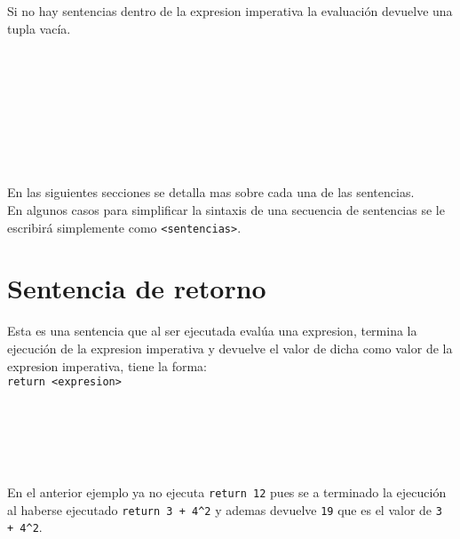       Si no hay sentencias dentro de la expresion imperativa la evaluación devuelve una tupla vacía.
      
      \begin{fxcode}
         \\
         \outcode{()}\\
         \\
         \\
         \outcode{()}\\
         \\
         \\
         \outcode{()}
      \end{fxcode}
      
      En las siguientes secciones se detalla mas sobre cada una de las sentencias.
      \\
      
      En algunos casos para simplificar la sintaxis de una secuencia de sentencias se le escribirá simplemente como \texttt{<sentencias>}.
      
   \section{Sentencia de retorno}
      Esta es una sentencia que al ser ejecutada evalúa una expresion, termina la ejecución de la expresion imperativa y devuelve el valor de dicha como valor de la expresion imperativa, tiene la forma:
      \\
      
      \texttt{return <expresion>}
      \\
      
      \begin{fxcode}
         \\
          \\
         \\
         \\
      \end{fxcode}
      
      En el anterior ejemplo ya no ejecuta \texttt{return 12} pues se a terminado la ejecución al haberse ejecutado \texttt{return 3 + 4\^{}2} y ademas devuelve \texttt{19} que es el valor de \texttt{3 + 4\^{}2}.
      \\
      
